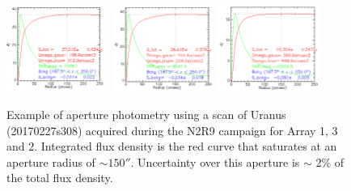 \begin{figure}[ht!]
  \begin{center}
    \includegraphics[clip=true,width=0.3\textwidth]{Figures/Aperture_photo/ura_a1.png}
    \includegraphics[clip=true,width=0.293\textwidth]{Figures/Aperture_photo/ura_a3.png}
    \includegraphics[clip=true,width=0.3\textwidth]{Figures/Aperture_photo/ura_a2.png}
    \caption[Aperture photometry of Uranus]{Example of aperture photometry using a scan of Uranus (20170227s308) acquired during the N2R9 campaign for Array 1, 3 and 2. Integrated flux density is the red curve that saturates at an aperture radius of $ \sim 150''$. Uncertainty over this aperture is $\sim$ 2\% of the total flux density. }
    \label{fig:Uranus_s308}
  \end{center}
\end{figure}

